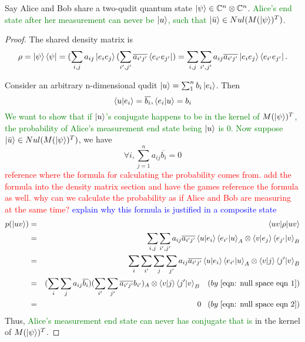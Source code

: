 
\begin{prop} \label{null space}
Say Alice and Bob share a two-qudit quantum state $\ket{\psi} \in \mathbb{C}^n \otimes \mathbb{C}^n$. \textcolor{green}{Alice's end state after her measurement can never be $\ket{u}$, such that} $\ket{\Bar{u}} \in Nul(M(\ket{\psi})^T)$.
\end{prop}
\begin{proof}
The shared density matrix is 
\begin{gather*}
\rho=\ket{\psi}\bra{\psi}=(\sum_{i,j} a_{ij}\ket{e_i e_j}(\sum_{i',j'} \overline{a_{i'j'}}\bra{e_{i'} e_{j'}})=\sum_{i,j} \sum_{i',j'} a_{ij} \overline{a_{i'j'}}\ket{e_i e_j}\bra{e_{i'} e_{j'}}.  
\end{gather*}

Consider an arbitrary n-dimensional qudit $\ket{u}=\sum_1^n b_i \ket{e_i}$. Then
\begin{equation} \label{eqn: null space eqn 1}
    \braket{u|e_i}=\overline{b_i}, \braket{e_i|u}=b_i
\end{equation}
\textcolor{green}{We want to show that if $\ket{u}$'s conjugate happens to be in the kernel of $M(\ket{\psi})^T$, the probability of Alice's measurement end state being $\ket{u}$ is 0. Now suppose}
$\ket{\Bar{u}} \in Nul(M(\ket{\psi})^T)$, we have \begin{equation} \label{eqn: null space eqn 2}
    \forall i, \sum_{j=1}^n a_{ij} \overline{b_i}=0
\end{equation}
\textcolor{red}{reference where the formula for calculating the probability comes from. add the formula into the density matrix section and have the games reference the formula as well. why can we calculate the probability as if Alice and Bob are measuring at the same time? }
\textcolor{blue}{explain why this formula is justified in a composite state}
\begin{eqnarray*}
p(\ket{uv})&=&\braket{u v | \rho |u v}\\
&=&\sum_{i,j} \sum_{i',j'} a_{ij} \overline{a_{i'j'}}\braket{u|e_i}\braket{e_{i'}|u}_A \otimes \braket{v|e_j}\braket{e_{j'}|v}_B\\
&=&\sum_i \sum_{i'} \sum_j \sum_{j'}  a_{ij} \overline{a_{i'j'}} \braket{u|e_i}\braket{e_{i'}|u}_A \otimes \braket{v|j}\braket{j'|v}_B\\
&=&(\sum_i \sum_j a_{ij} \overline{b_i})(\sum_{i'} \sum_{j'} \overline{a_{i'j'}} b_{i'})_A \otimes \braket{v|j}\braket{j'|v}_B   \; \; \;  (by \;  \eqref{eqn: null space eqn 1})\\ 
&=& 0 \; \; \; (by \; \eqref{eqn: null space eqn 2})
\end{eqnarray*}
Thus, \textcolor{green}{Alice's measurement end state can never has conjugate that is} in the kernel of $M(\ket{\psi})^T$.
\end{proof}

